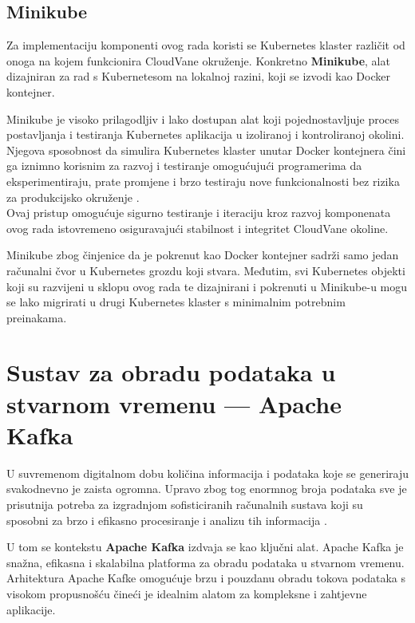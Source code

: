 \documentclass[times, utf8, diplomski]{fer}
\begin{document}
\citep{luksa_kubernetes_2023}

\clearpage
\subsection{Minikube}
\label{sec:minikube}

Za implementaciju komponenti ovog rada koristi se Kubernetes klaster različit od onoga na kojem funkcionira CloudVane okruženje. Konkretno \textbf{Minikube}, alat dizajniran za rad s Kubernetesom na lokalnoj razini, koji se izvodi kao Docker kontejner.

Minikube je visoko prilagodljiv i lako dostupan alat koji pojednostavljuje proces postavljanja i testiranja Kubernetes aplikacija u izoliranoj i kontroliranoj okolini. Njegova sposobnost da simulira Kubernetes klaster unutar Docker kontejnera čini ga iznimno korisnim za razvoj i testiranje omogućujući programerima da eksperimentiraju, prate promjene i brzo testiraju nove funkcionalnosti bez rizika za produkcijsko okruženje \citep{luksa_kubernetes_2023}. \\

Ovaj pristup omogućuje sigurno testiranje i iteraciju kroz razvoj komponenata ovog rada istovremeno osiguravajući stabilnost i integritet CloudVane okoline. 

Minikube zbog činjenice da je pokrenut kao Docker kontejner sadrži samo jedan računalni čvor u Kubernetes grozdu koji stvara. Međutim, svi Kubernetes objekti koji su razvijeni u sklopu ovog rada te dizajnirani i pokrenuti u Minikube-u mogu se lako migrirati u drugi Kubernetes klaster s minimalnim potrebnim preinakama.

\clearpage
\section{Sustav za obradu podataka u stvarnom vremenu --- Apache Kafka}
\label{sec:kafka}

U suvremenom digitalnom dobu količina informacija i podataka koje se generiraju svakodnevno je zaista ogromna. Upravo zbog tog enormnog broja podataka sve je prisutnija potreba za izgradnjom sofisticiranih računalnih sustava koji su sposobni za brzo i efikasno procesiranje i analizu tih informacija \citep{cubek_apache_2022}.

U tom se kontekstu \textbf{Apache Kafka} izdvaja se kao ključni alat. Apache Kafka je snažna, efikasna i skalabilna platforma za obradu podataka u stvarnom vremenu. Arhitektura Apache Kafke omogućuje brzu i pouzdanu obradu tokova podataka s visokom propusnošću čineći je idealnim alatom za kompleksne i zahtjevne aplikacije. 
\end{document}
